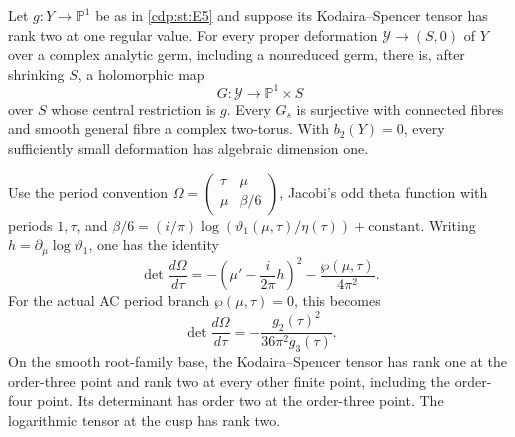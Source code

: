 \begin{proposition}\label{cdp:st:E6}

Let $g:Y\to\mathbb P^1$ be as in \ref{cdp:st:E5} and suppose its
Kodaira--Spencer tensor has rank two at one regular value. For every
proper deformation $\mathcal Y\to(S,0)$ of $Y$ over a complex
analytic germ, including a nonreduced germ, there is, after shrinking
$S$, a holomorphic map
\[
 G:\mathcal Y\longrightarrow\mathbb P^1\times S
\]
over $S$ whose central restriction is $g$. Every $G_s$ is surjective
with connected fibres and smooth general fibre a complex two-torus.
With $b_2(Y)=0$, every sufficiently small deformation has algebraic
dimension one.
\end{proposition}

\begin{proposition}\label{cdp:st:E8}

Use the period convention
$\Omega=\left(\begin{smallmatrix}\tau&\mu\\\mu&\beta/6\end{smallmatrix}\right)$,
Jacobi's odd theta function with periods $1,\tau$, and
$\beta/6=(i/\pi)\log(\vartheta_1(\mu,\tau)/\eta(\tau))+\text{constant}$.
Writing $h=\partial_\mu\log\vartheta_1$, one has the identity
\begin{equation}\label{cdp:eq:E-theta-general}
 \det\frac{d\Omega}{d\tau}
 =-\left(\mu'-\frac{i}{2\pi}h\right)^2
       -\frac{\wp(\mu,\tau)}{4\pi^2}.
\end{equation}
For the actual AC period branch $\wp(\mu,\tau)=0$, this becomes
\[
 \det\frac{d\Omega}{d\tau}
       =-\frac{g_2(\tau)^2}{36\pi^2g_3(\tau)}.
\]
On the smooth root-family base, the Kodaira--Spencer tensor has rank
one at the order-three point and rank two at every other finite
point, including the order-four point. Its determinant has order
two at the order-three point. The logarithmic tensor at the cusp
has rank two.
\end{proposition}

